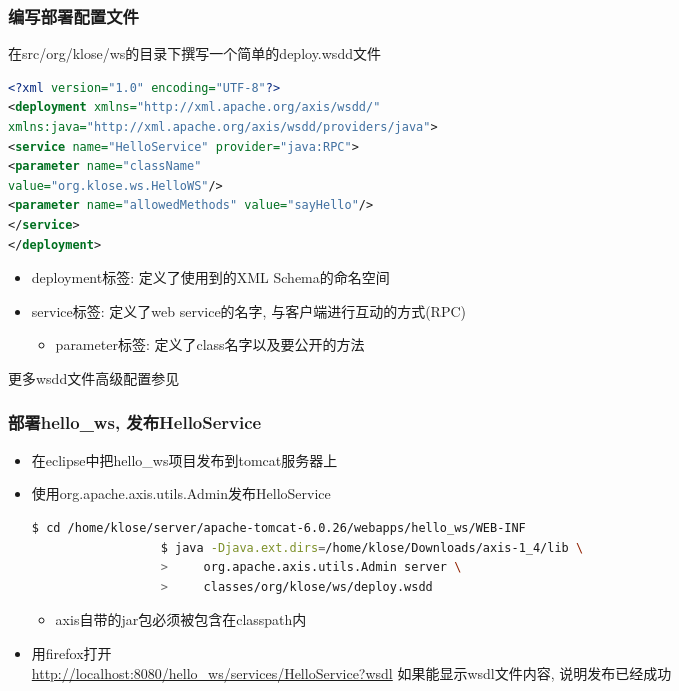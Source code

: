 \documentclass[CJKutf8,compress,hyperref]{beamer}
\begin{document}
\begin{CJK}{UTF8}{song}
\begin{frame}[containsverbatim]
\frametitle{编写部署配置文件}
在src/org/klose/ws的目录下撰写一个简单的deploy.wsdd文件
\begin{lstlisting}[language=XML]
<?xml version="1.0" encoding="UTF-8"?>
<deployment xmlns="http://xml.apache.org/axis/wsdd/"
xmlns:java="http://xml.apache.org/axis/wsdd/providers/java">
<service name="HelloService" provider="java:RPC">
<parameter name="className" 
value="org.klose.ws.HelloWS"/>
<parameter name="allowedMethods" value="sayHello"/>
</service>
</deployment>
\end{lstlisting}
\begin{itemize}
        \item {\color{red}deployment}标签: 定义了使用到的XML Schema的命名空间
        \item {\color{red}service}标签: 定义了web service的名字, 与客户端进行互动的方式(RPC)
                \begin{itemize}
                        \item {\color{red}parameter}标签: 定义了class名字以及要公开的方法
                \end{itemize}
\end{itemize}
更多wsdd文件高级配置参见\cite{DeploymentWSDD}
  \end{frame}

  \begin{frame}[containsverbatim]
  \frametitle{部署hello\_ws, 发布HelloService}
  \begin{itemize}
          \item 在eclipse中把hello\_ws项目发布到tomcat服务器上
          \item 使用{\color{red}org.apache.axis.utils.Admin}发布HelloService\cite{StaticDeployment}
                  \begin{lstlisting}[language=bash]
                  $ cd /home/klose/server/apache-tomcat-6.0.26/webapps/hello_ws/WEB-INF  
                  $ java -Djava.ext.dirs=/home/klose/Downloads/axis-1_4/lib \ 
                  >     org.apache.axis.utils.Admin server \ 
                  >     classes/org/klose/ws/deploy.wsdd 
                  \end{lstlisting}
                  \begin{itemize}
                          \item {\color{red}axis自带的jar包}必须被包含在{\color{red}classpath}内
                  \end{itemize}
          \item 用firefox打开\\
                  \small{{\color{blue}\url{http://localhost:8080/hello_ws/services/HelloService?wsdl}}}
                  如果能显示wsdl文件内容, 说明发布已经成功
  \end{itemize}
  \end{frame}


\end{CJK}
\end{document}
